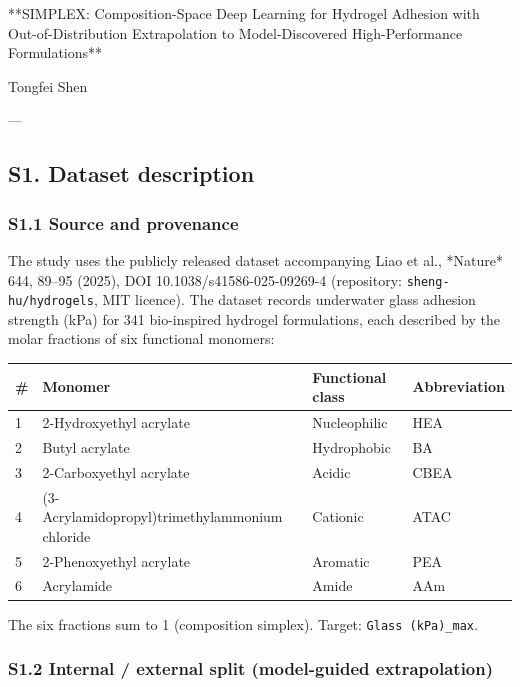 \documentclass[utf8]{frontiers_suppmat}
\begin{document}
\onecolumn
{}

\title[Supplementary Material]{{}}

\maketitle

**SIMPLEX: Composition-Space Deep Learning for Hydrogel Adhesion with
Out-of-Distribution Extrapolation to Model-Discovered High-Performance
Formulations**

Tongfei Shen

---

\subsection{S1. Dataset description}

\subsubsection{S1.1 Source and provenance}

The study uses the publicly released dataset accompanying Liao et al.,
*Nature* 644, 89–95 (2025), DOI 10.1038/s41586-025-09269-4
(repository: \texttt{sheng-hu/hydrogels}, MIT licence). The dataset records
underwater glass adhesion strength (kPa) for 341 bio-inspired hydrogel
formulations, each described by the molar fractions of six functional
monomers:

\begin{tabular}{llll}
\toprule
# & Monomer & Functional class & Abbreviation \\
\midrule
1 & 2-Hydroxyethyl acrylate & Nucleophilic & HEA \\
2 & Butyl acrylate & Hydrophobic & BA \\
3 & 2-Carboxyethyl acrylate & Acidic & CBEA \\
4 & (3-Acrylamidopropyl)trimethylammonium chloride & Cationic & ATAC \\
5 & 2-Phenoxyethyl acrylate & Aromatic & PEA \\
6 & Acrylamide & Amide & AAm \\
\bottomrule
\end{tabular}


The six fractions sum to 1 (composition simplex). Target: \texttt{Glass (kPa)_max}.

\subsubsection{S1.2 Internal / external split (model-guided extrapolation)}
\end{document}
